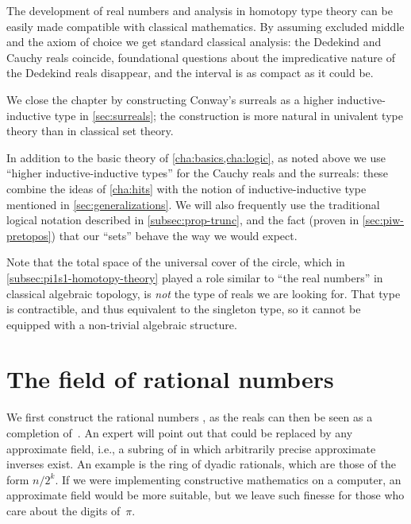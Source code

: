 The development of real numbers and analysis in homotopy type theory can be easily made compatible with classical mathematics. By assuming excluded middle and the axiom of choice we get standard classical analysis: the Dedekind and Cauchy reals coincide, foundational questions about the impredicative nature of the Dedekind reals disappear, and the interval is as compact as it could be.

We close the chapter by constructing Conway's surreals as a higher inductive-inductive type in \cref{sec:surreals};
the construction is more natural in univalent type theory than in  classical set theory.

In addition to the basic theory of \cref{cha:basics,cha:logic}, as noted above we use ``higher inductive-inductive types'' for the Cauchy reals and the surreals: these combine the ideas of \cref{cha:hits} with the notion of inductive-inductive type mentioned in \cref{sec:generalizations}.
We will also frequently use the traditional logical notation described in \cref{subsec:prop-trunc}, and the fact (proven in \cref{sec:piw-pretopos}) that our ``sets'' behave the way we would expect.

Note that the total space of the universal cover of the circle, which
in \cref{subsec:pi1s1-homotopy-theory} played a role similar to ``the real numbers'' in
classical algebraic topology, is \emph{not} the type of reals we are looking for. That
type is contractible, and thus equivalent to the singleton type, so it cannot be equipped
with a non-trivial algebraic structure.



\section{The field of rational numbers}
\label{sec:field-rati-numb}

%
%
We first construct the rational numbers \Q, as the reals can then be seen as a completion
of~\Q. An expert will point out that \Q could be replaced by any approximate field,
%
i.e., a subring of \Q in which arbitrarily precise approximate inverses
%
exist. An example is the
ring of dyadic rationals,
%
which are those of the form $n/2^k$.
If we were implementing constructive mathematics on a computer,
an approximate field would be more suitable, but we leave such finesse for those
who care about the digits of~$\pi$.


